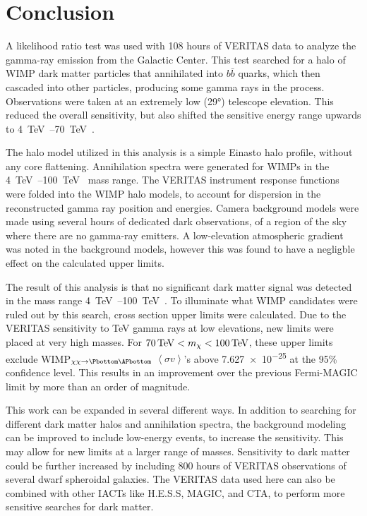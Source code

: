 \cleartooddpage[\thispagestyle{empty}]
\chapter{Conclusion}

A likelihood ratio test was used with 108 hours of VERITAS data to analyze the gamma-ray emission from the Galactic Center.
This test searched for a halo of WIMP dark matter particles that annihilated into $b\bar{b}$ quarks, which then cascaded into other particles, producing some gamma rays in the process.
Observations were taken at an extremely low (\nicetilde{}\ang{29}) telescope elevation.
This reduced the overall sensitivity, but also shifted the sensitive energy range upwards to \SIrange{4}{70}{\TeV{}}.

The halo model utilized in this analysis is a simple Einasto halo profile, without any core flattening.
Annihilation spectra were generated for WIMPs in the \SIrange{4}{100}{\TeV{}} mass range.
The VERITAS instrument response functions were folded into the WIMP halo models, to account for dispersion in the reconstructed gamma ray position and energies.
Camera background models were made using several hours of dedicated dark observations, of a region of the sky where there are no gamma-ray emitters.
A low-elevation atmospheric gradient was noted in the background models, however this was found to have a negligble effect on the calculated upper limits.

The result of this analysis is that no significant dark matter signal was detected in the mass range \SIrange{4}{100}{\TeV{}}.
To illuminate what WIMP candidates were ruled out by this search, cross section upper limits were calculated.
Due to the VERITAS sensitivity to TeV gamma rays at low elevations, new limits were placed at very high masses.
For $70\,\TeV<m_{\chi}<100\,\TeV$, these upper limits exclude WIMP$_{\chi\chi\rightarrow\Pbottom\APbottom}$ $\left \langle \sigma v \right \rangle$'s above \SI{7.627e-25}{} at the 95\% confidence level.
This results in an improvement over the previous Fermi-MAGIC limit by more than an order of magnitude.

This work can be expanded in several different ways.
In addition to searching for different dark matter halos and annihilation spectra, the background modeling can be improved to include low-energy events, to increase the sensitivity.
This may allow for new limits at a larger range of masses.
Sensitivity to dark matter could be further increased by including \nicetilde{}800 hours of VERITAS observations of several dwarf spheroidal galaxies.
The VERITAS data used here can also be combined with other IACTs like H.E.S.S, MAGIC, and CTA, to perform more sensitive searches for dark matter.

